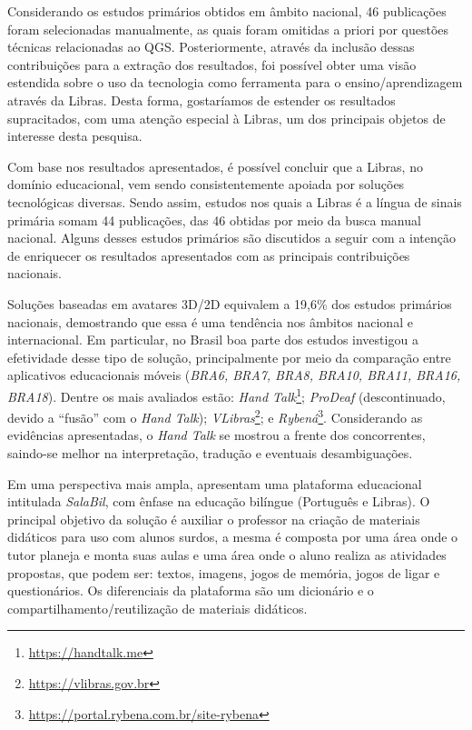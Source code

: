 
Considerando os estudos primários obtidos em âmbito nacional, 46 publicações foram selecionadas manualmente, as quais foram omitidas a priori por questões técnicas relacionadas ao QGS. Posteriormente, através da inclusão dessas contribuições para a extração dos resultados, foi possível obter uma visão estendida sobre o uso da tecnologia como ferramenta para o ensino/aprendizagem através da Libras. Desta forma, gostaríamos de estender os resultados supracitados, com uma atenção especial à Libras, um dos principais objetos de interesse desta pesquisa.

Com base nos resultados apresentados, é possível concluir que a Libras, no domínio educacional, vem sendo consistentemente apoiada por soluções tecnológicas diversas. Sendo assim, estudos nos quais a Libras é a língua de sinais primária somam 44 publicações, das 46 obtidas por meio da busca manual nacional. Alguns desses estudos primários são discutidos a seguir com a intenção de enriquecer os resultados apresentados com as principais contribuições nacionais.

Soluções baseadas em avatares 3D/2D equivalem a 19,6\% dos estudos primários nacionais, demostrando que essa é uma tendência nos âmbitos nacional e internacional. Em particular, no Brasil boa parte dos estudos investigou a efetividade desse tipo de solução, principalmente por meio da comparação entre aplicativos educacionais móveis (\textit{BRA6, BRA7, BRA8, BRA10, BRA11, BRA16, BRA18}). Dentre os mais avaliados estão: \textit{Hand Talk}\footnote{\url{https://handtalk.me}}; \textit{ProDeaf} (descontinuado, devido a ``fusão'' com o \textit{Hand Talk}); \textit{VLibras}\footnote{\url{https://vlibras.gov.br}}; e \textit{Rybená}\footnote{\url{https://portal.rybena.com.br/site-rybena}}. Considerando as evidências apresentadas, o \textit{Hand Talk} se mostrou a frente dos concorrentes, saindo-se melhor na interpretação, tradução e eventuais desambiguações.

Em uma perspectiva mais ampla,  apresentam uma plataforma educacional intitulada \textit{SalaBil}, com ênfase na educação bilíngue (Português e Libras). O principal objetivo da solução é auxiliar o professor na criação de materiais didáticos para uso com alunos surdos, a mesma é composta por uma área onde o tutor planeja e monta suas aulas e uma área onde o aluno realiza as atividades propostas, que podem ser: textos, imagens, jogos de memória, jogos de ligar e questionários. Os diferenciais da plataforma são um dicionário e o compartilhamento/reutilização de materiais didáticos.

